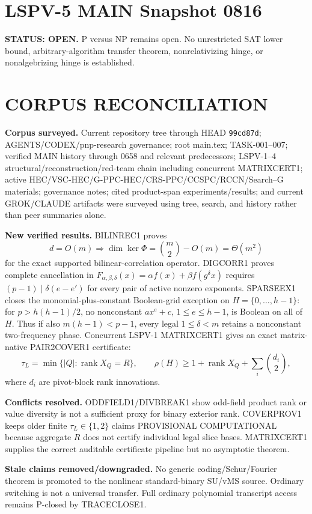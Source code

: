\documentclass[11pt]{article}\usepackage[margin=.86in]{geometry}\usepackage{amsmath,amssymb}
\begin{document}
\section*{LSPV-5 MAIN Snapshot 0816}
\textbf{STATUS: OPEN.} P versus NP remains open. No unrestricted SAT lower bound, arbitrary-algorithm transfer theorem, nonrelativizing hinge, or nonalgebrizing hinge is established.

\section*{CORPUS RECONCILIATION}
\textbf{Corpus surveyed.} Current repository tree through HEAD \texttt{99cd87d}; AGENTS/CODEX/pnp-research governance; root main.tex; TASK-001--007; verified MAIN history through 0658 and relevant predecessors; LSPV-1--4 structural/reconstruction/red-team chain including concurrent MATRIXCERT1; active HEC/VSC-HEC/G-PPC-HEC/CRS-PPC/CCSPC/RCCN/Search--G materials; governance notes; cited product-span experiments/results; and current GROK/CLAUDE artifacts were surveyed using tree, search, and history rather than peer summaries alone.

\textbf{New verified results.} BILINREC1 proves
\[
d=O(m)\Longrightarrow\dim\ker\Phi=\binom m2-O(m)=\Theta(m^2)
\]
for the exact supported bilinear-correlation operator. DIGCORR1 proves complete cancellation in \(F_{\alpha,\beta,\delta}(x)=\alpha f(x)+\beta f(g^\delta x)\) requires \((p-1)\mid\delta(e-e')\) for every pair of active nonzero exponents. SPARSEEX1 closes the monomial-plus-constant Boolean-grid exception on \(H=\{0,\ldots,h-1\}\): for \(p>h(h-1)/2\), no nonconstant \(ax^e+c\), \(1\le e\le h-1\), is Boolean on all of \(H\). Thus if also \(m(h-1)<p-1\), every legal \(1\le\delta<m\) retains a nonconstant two-frequency phase. Concurrent LSPV-1 MATRIXCERT1 gives an exact matrix-native PAIR2COVER1 certificate:
\[
\tau_L=\min\{|Q|:\operatorname{rank}X_Q=R\},\qquad
\rho(H)\ge1+\operatorname{rank}X_Q+\sum_i\binom{d_i}{2},
\]
where \(d_i\) are pivot-block rank innovations.

\textbf{Conflicts resolved.} ODDFIELD1/DIVBREAK1 show odd-field product rank or value diversity is not a sufficient proxy for binary exterior rank. COVERPROV1 keeps older finite \(\tau_L\in\{1,2\}\) claims PROVISIONAL COMPUTATIONAL because aggregate \(R\) does not certify individual legal slice bases. MATRIXCERT1 supplies the correct auditable certificate pipeline but no asymptotic theorem.

\textbf{Stale claims removed/downgraded.} No generic coding/Schur/Fourier theorem is promoted to the nonlinear standard-binary SU/vMS source. Ordinary switching is not a universal transfer. Full ordinary polynomial transcript access remains P-closed by TRACECLOSE1.
\end{document}
